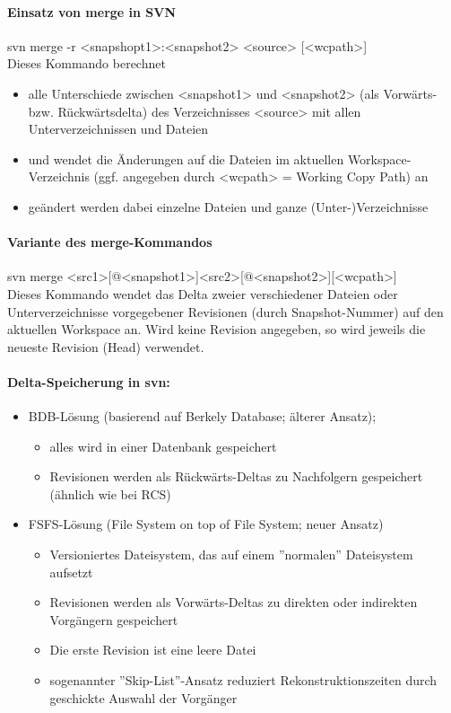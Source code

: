 \paragraph{Einsatz von merge in SVN}
svn merge -r <snapshopt1>:<snapshot2> <source> [<wcpath>]
\\
Dieses Kommando berechnet
\begin{itemize}
	\item  alle Unterschiede zwischen <snapshot1> und <snapshot2> (als Vorwärts- bzw. Rückwärtsdelta) des Verzeichnisses <source> mit allen Unterverzeichnissen und Dateien
	\item und wendet die Änderungen auf die Dateien im aktuellen Workspace-Verzeichnis (ggf. angegeben durch <wcpath> = Working Copy Path) an
	\item geändert werden dabei einzelne Dateien und ganze (Unter-)Verzeichnisse
\end{itemize}
\paragraph{Variante des merge-Kommandos}
svn merge <src1>[@<snapshot1>]<src2>[@<snapshot2>][<wcpath>]
\\
Dieses Kommando wendet das Delta zweier verschiedener Dateien oder Unterverzeichnisse vorgegebener Revisionen (durch Snapshot-Nummer) auf den aktuellen Workspace an. Wird keine Revision angegeben, so wird jeweils die neueste Revision (Head) verwendet.
\paragraph{Delta-Speicherung in svn:}
\begin{itemize}
	\item BDB-Lösung (basierend auf Berkely Database; älterer Ansatz);
	\begin{itemize}
		\item alles wird in einer Datenbank gespeichert
		\item Revisionen werden als Rückwärts-Deltas zu Nachfolgern gespeichert (ähnlich wie bei RCS)
	\end{itemize}
	\item FSFS-Lösung (File System on top of File System; neuer Ansatz)
	\begin{itemize}
		\item Versioniertes Dateisystem, das auf einem ''normalen'' Dateisystem aufsetzt
		\item Revisionen werden als Vorwärts-Deltas zu direkten oder indirekten Vorgängern gespeichert
		\item Die erste Revision ist eine leere Datei
		\item sogenannter ''Skip-List''-Ansatz reduziert Rekonstruktionszeiten durch geschickte Auswahl der Vorgänger
	\end{itemize}
\end{itemize}
